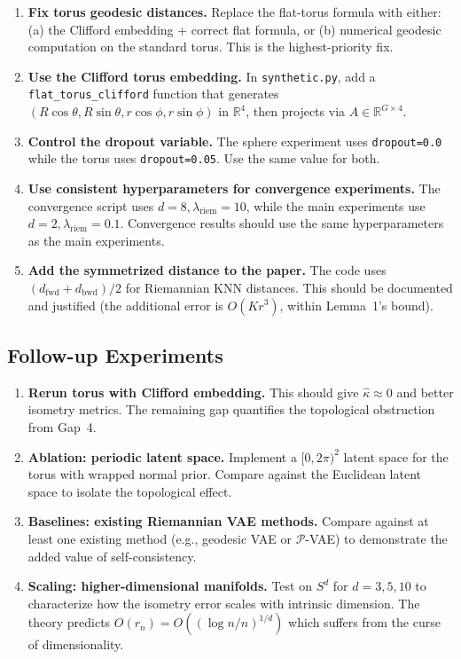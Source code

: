 \documentclass{article}
\begin{document}
\begin{enumerate}[label=\textbf{C\arabic*.}]
\item \textbf{Fix torus geodesic distances.}
  Replace the flat-torus formula with either:
  (a) the Clifford embedding + correct flat formula, or
  (b) numerical geodesic computation on the standard torus.
  This is the highest-priority fix.

\item \textbf{Use the Clifford torus embedding.}
  In \texttt{synthetic.py}, add a \texttt{flat\_torus\_clifford} function that
  generates $(R\cos\theta, R\sin\theta, r\cos\phi, r\sin\phi)$ in $\mathbb{R}^4$,
  then projects via $A \in \mathbb{R}^{G \times 4}$.

\item \textbf{Control the dropout variable.}
  The sphere experiment uses \texttt{dropout=0.0} while the torus uses
  \texttt{dropout=0.05}. Use the same value for both.

\item \textbf{Use consistent hyperparameters for convergence experiments.}
  The convergence script uses $d = 8, \lambda_{\text{riem}} = 10$, while the
  main experiments use $d = 2, \lambda_{\text{riem}} = 0.1$. Convergence
  results should use the same hyperparameters as the main experiments.

\item \textbf{Add the symmetrized distance to the paper.}
  The code uses $(d_{\text{fwd}} + d_{\text{bwd}})/2$ for Riemannian KNN
  distances. This should be documented and justified (the additional error
  is $O(K r^3)$, within Lemma~1's bound).
\end{enumerate}

\subsection{Follow-up Experiments}

\begin{enumerate}[label=\textbf{E\arabic*.}]
\item \textbf{Rerun torus with Clifford embedding.}
  This should give $\hat{\kappa} \approx 0$ and better isometry metrics.
  The remaining gap quantifies the topological obstruction from Gap~4.

\item \textbf{Ablation: periodic latent space.}
  Implement a $[0, 2\pi)^2$ latent space for the torus with wrapped normal
  prior. Compare against the Euclidean latent space to isolate the
  topological effect.

\item \textbf{Baselines: existing Riemannian VAE methods.}
  Compare against at least one existing method (e.g., geodesic VAE or
  $\mathcal{P}$-VAE) to demonstrate the added value of self-consistency.

\item \textbf{Scaling: higher-dimensional manifolds.}
  Test on $S^d$ for $d = 3, 5, 10$ to characterize how the isometry error
  scales with intrinsic dimension. The theory predicts $O(r_n) = O((\log n/n)^{1/d})$
  which suffers from the curse of dimensionality.
\end{enumerate}
\end{document}
